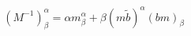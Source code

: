 \begin{equation}
  (M^{-1})^{\alpha}_{{\beta}} = \alpha m^{\alpha}_{{\beta}}
  + \beta (m\tilde{b})^\alpha (bm)_{{\beta}}
\end{equation}

